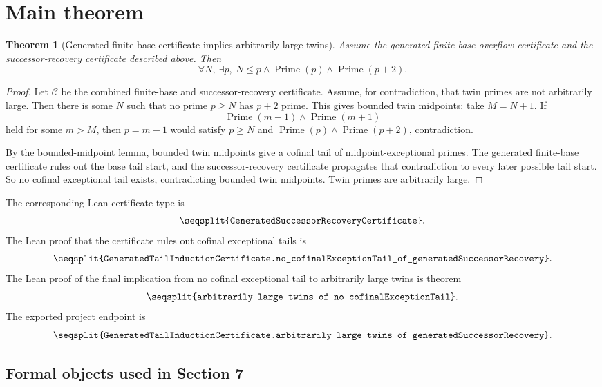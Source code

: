 \documentclass[11pt]{article}
\newtheorem{theorem}{Theorem}[section]
\newcommand{\Prime}{\operatorname{Prime}}
\newcommand{\Lean}[1]{\texttt{\seqsplit{#1}}}
\begin{document}
\clearpage
\section{Main theorem}
\noindent

\begin{theorem}[Generated finite-base certificate implies arbitrarily large twins]
Assume the generated finite-base overflow certificate and the successor-recovery
certificate described above.  Then
\[
  \forall N,\ \exists p,\ N\le p\wedge\Prime(p)\wedge\Prime(p+2).
\]
\end{theorem}

\begin{proof}
Let \(\mathcal C\) be the combined finite-base and successor-recovery
certificate.
Assume, for contradiction, that twin primes are not arbitrarily large.  Then
there is some \(N\) such that no prime \(p\ge N\) has \(p+2\) prime.  This
gives bounded twin midpoints: take \(M=N+1\).  If
\[
  \Prime(m-1)\wedge\Prime(m+1)
\]
held for some \(m>M\), then \(p=m-1\) would satisfy \(p\ge N\) and
\(\Prime(p)\wedge\Prime(p+2)\), contradiction.

By the bounded-midpoint lemma, bounded twin midpoints give a cofinal tail of
midpoint-exceptional primes.  The generated finite-base certificate rules out
the base tail start, and the successor-recovery certificate propagates that
contradiction to every later possible tail start.  So no cofinal exceptional
tail exists, contradicting bounded twin midpoints.  Twin primes are arbitrarily
large.
\end{proof}

The corresponding Lean certificate type is
\[
  \Lean{GeneratedSuccessorRecoveryCertificate}.
\]
The Lean proof that the certificate rules out cofinal exceptional tails is
\[
  \Lean{GeneratedTailInductionCertificate.no\_cofinalExceptionTail\_of\_generatedSuccessorRecovery}.
\]
The Lean proof of the final implication from no cofinal exceptional tail to
arbitrarily large twins is theorem
\[
  \Lean{arbitrarily\_large\_twins\_of\_no\_cofinalExceptionTail}.
\]
The exported project endpoint is
\[
  \Lean{GeneratedTailInductionCertificate.arbitrarily\_large\_twins\_of\_generatedSuccessorRecovery}.
\]

\subsection{Formal objects used in Section 7}
\end{document}
